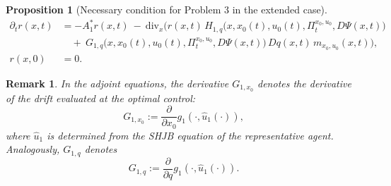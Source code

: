\documentclass[12pt]{article}
\newtheorem{prop}[teo]{Proposition}
\newtheorem*{obs*}{Remark}
\theoremstyle{definition}
\begin{document}
\begin{prop}[Necessary condition for Problem 3 in the extended case]
\[
\begin{aligned}
\label{Adj-r}
\partial_t r(x,t)&=-A_1^* r(x,t)\ -\ \mathrm{div}_x\!\Big(
r(x,t)\,H_{1,q}\!\big(x,x_0(t),u_0(t),\Pi^{x_0,u_0}_t,D\Psi(x,t)\big) \\
&\quad +\ G_{1,q}\!\big(x,x_0(t),u_0(t),\Pi^{x_0,u_0}_t,D\Psi(x,t)\big)\,Dq(x,t)\,m_{x_0,u_0}(x,t)
\Big), \\
r(x,0)&=0.
\end{aligned}
\tag{Adj-r}
\]
\end{prop}

\begin{obs*}
In the adjoint equations, the derivative $G_{1,x_0}$ denotes the derivative of the drift evaluated at the optimal control:
$$G_{1,x_0} := \frac{\partial}{\partial x_0}g_1(\cdot, \hat{u}_1(\cdot)),$$
where $\hat{u}_1$ is determined from the SHJB equation of the representative agent. Analogously, $G_{1,q}$ denotes
$$G_{1,q} := \frac{\partial}{\partial q}g_1(\cdot, \hat{u}_1(\cdot)).$$
\end{obs*}
\end{document}
